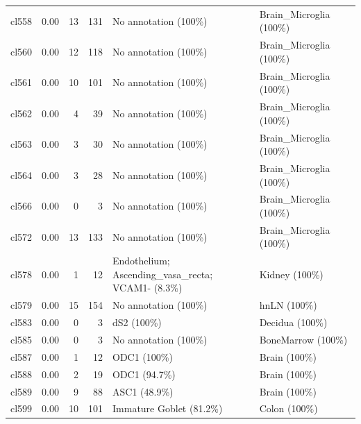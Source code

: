 \begin{table}[ht!]
\begin{tabular}{lrrrll}
  cl558 & 0.00 &  13 & 131 & No annotation (100\%) & Brain\_Microglia (100\%) \\ 
  cl560 & 0.00 &  12 & 118 & No annotation (100\%) & Brain\_Microglia (100\%) \\ 
  cl561 & 0.00 &  10 & 101 & No annotation (100\%) & Brain\_Microglia (100\%) \\ 
  cl562 & 0.00 &   4 &  39 & No annotation (100\%) & Brain\_Microglia (100\%) \\ 
  cl563 & 0.00 &   3 &  30 & No annotation (100\%) & Brain\_Microglia (100\%) \\ 
  cl564 & 0.00 &   3 &  28 & No annotation (100\%) & Brain\_Microglia (100\%) \\ 
  cl566 & 0.00 &   0 &   3 & No annotation (100\%) & Brain\_Microglia (100\%) \\ 
  cl572 & 0.00 &  13 & 133 & No annotation (100\%) & Brain\_Microglia (100\%) \\ 
  cl578 & 0.00 &   1 &  12 & \specialcell[t]{Endothelium; Ascending\_vasa\_recta;\\VCAM1- (8.3\%)} & Kidney (100\%) \\ 
  cl579 & 0.00 &  15 & 154 & No annotation (100\%) & hnLN (100\%) \\ 
  cl583 & 0.00 &   0 &   3 & dS2 (100\%) & Decidua (100\%) \\ 
  cl585 & 0.00 &   0 &   3 & No annotation (100\%) & BoneMarrow (100\%) \\ 
  cl587 & 0.00 &   1 &  12 & ODC1 (100\%) & Brain (100\%) \\ 
  cl588 & 0.00 &   2 &  19 & ODC1 (94.7\%) & Brain (100\%) \\ 
  cl589 & 0.00 &   9 &  88 & ASC1 (48.9\%) & Brain (100\%) \\ 
  cl599 & 0.00 &  10 & 101 & Immature Goblet (81.2\%) & Colon (100\%) \\ 
   \bottomrule
\end{tabular}
\end{table}


